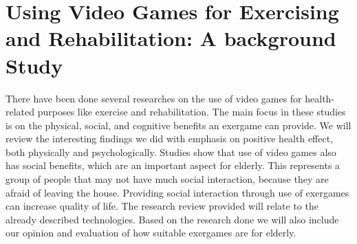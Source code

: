 \section{Using Video Games for Exercising and Rehabilitation: A background Study}
There have been done several researches on the use of video games for health-related purposes like exercise and rehabilitation. The main focus in these studies is on the physical, social, and cognitive benefits an exergame can provide. We will review the interesting findings we did with emphasis on positive health effect, both physically and psychologically. Studies show that use of video games also has social benefits, which are an important aspect for elderly. This represents a group of people that may not have much social interaction, because they are afraid of leaving the house. Providing social interaction through use of exergames can increase quality of life. The research review provided will relate to the already described technologies. Based on the research done we will also include our opinion and evaluation of how suitable exergames are for elderly. \\ \\
